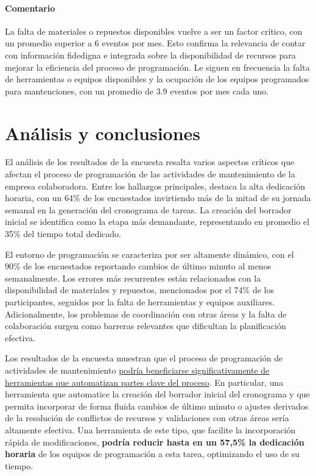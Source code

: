 \documentclass{article}
\begin{document}
\begin{appendix}
    \paragraph{Comentario}La falta de materiales o repuestos disponibles vuelve a ser un factor crítico, con un promedio superior a 6 eventos por mes. Esto confirma la relevancia de contar con información fidedigna e integrada sobre la disponibilidad de recursos para mejorar la eficiencia del proceso de programación. Le siguen en frecuencia la falta de herramientas o equipos disponibles y la ocupación de los equipos programados para mantenciones, con un promedio de 3.9 eventos por mes cada uno.
    
    \section*{Análisis y conclusiones}
    
    El análisis de los resultados de la encuesta resalta varios aspectos críticos que afectan el proceso de programación de las actividades de mantenimiento de la empresa colaboradora. Entre los hallazgos principales, destaca la alta dedicación horaria, con un 64\% de los encuestados invirtiendo más de la mitad de su jornada semanal en la generación del cronograma de tareas. La creación del borrador inicial se identifica como la etapa más demandante, representando en promedio el 35\% del tiempo total dedicado.
    
    El entorno de programación se caracteriza por ser altamente dinámico, con el 90\% de los encuestados reportando cambios de último minuto al menos semanalmente. Los errores más recurrentes están relacionados con la disponibilidad de materiales y repuestos, mencionados por el 74\% de los participantes, seguidos por la falta de herramientas y equipos auxiliares. Adicionalmente, los problemas de coordinación con otras áreas y la falta de colaboración surgen como barreras relevantes que dificultan la planificación efectiva.
    
    Los resultados de la encuesta muestran que el proceso de programación de actividades de mantenimiento \uline{podría beneficiarse significativamente de herramientas que automatizan partes clave del proceso}. En particular, una herramienta que automatice la creación del borrador inicial del cronograma y que permita incorporar de forma fluida cambios de último minuto o ajustes derivados de la resolución de conflictos de recursos y validaciones con otras áreas sería altamente efectiva. Una herramienta de este tipo, que facilite la incorporación rápida de modificaciones, \textbf{podría reducir hasta en un 57,5\% la dedicación horaria} de los equipos de programación a esta tarea, optimizando el uso de su tiempo.
    

\end{appendix}
\end{document}
